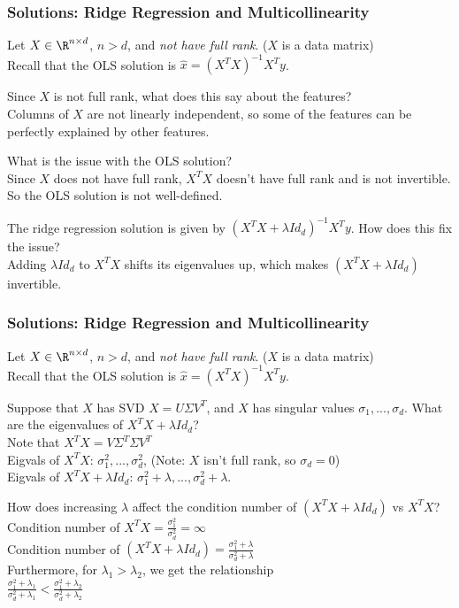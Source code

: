 \documentclass{beamer}
\renewenvironment{enumerate}%
{\begin{list}{\arabic{enumi}.}%
      {\setlength{\leftmargin}{2.5em}%
       \setlength{\itemsep}{-\parsep}%
       \setlength{\topsep}{-\parskip}%
       \usecounter{enumi}}%
 }{\end{list}}
\begin{document}
\begin{frame}
\frametitle{Solutions: Ridge Regression and Multicollinearity}
Let $X \in \R^{n\times d}$, $n>d$, and \textit{not have full rank}. ($X$ is a data matrix) \\
Recall that the OLS solution is $\hat{x} = (X^TX)^{-1}X^Ty$.
\begin{solution}
\begin{enumerate}
\item Since $X$ is not full rank, what does this say about the features?\\
Columns of $X$ are not linearly independent, so some of the features can be perfectly explained by other features.
\item What is the issue with the OLS solution? \\
Since $X$ does not have full rank, $X^TX$ doesn't have full rank and is not invertible. So the OLS solution is not well-defined.
\item The ridge regression solution is given by $(X^TX+\lambda Id_d)^{-1}X^Ty$. How does this fix the issue? \\
Adding $\lambda Id_d$ to $X^TX$ shifts its eigenvalues up, which makes $(X^TX+\lambda Id_d)$ invertible.
\end{enumerate}
\end{solution}
\end{frame}

\begin{frame}
\frametitle{Solutions: Ridge Regression and Multicollinearity}
Let $X \in \R^{n\times d}$, $n>d$, and \textit{not have full rank}. ($X$ is a data matrix) \\
Recall that the OLS solution is $\hat{x} = (X^TX)^{-1}X^Ty$.
\begin{solution}
\begin{enumerate}
\item[4.] Suppose that $X$ has SVD $X=U\Sigma V^T$, and $X$ has singular values $\sigma_1,...,\sigma_d$. What are the eigenvalues of 
$X^TX + \lambda Id_d$? \\
Note that $X^TX = V\Sigma^T \Sigma V^T$\\
Eigvals of $X^TX$: $\sigma_1^2,...,\sigma_d^2$, (Note: $X$ isn't full rank, so $\sigma_d = 0$) \\
Eigvals of $X^TX+\lambda Id_d$: $\sigma_1^2 + \lambda ,..., \sigma_d^2+\lambda$.\\
\item[5.] How does increasing $\lambda$ affect the condition number of $(X^TX + \lambda Id_d)$ vs $X^TX$?\\
Condition number of $X^TX = \frac{\sigma_1^2}{\sigma_d^2} = \infty$ \\
Condition number of $(X^TX + \lambda Id_d) = \frac{\sigma_1^2+\lambda}{\sigma_d^2+\lambda}$\\
Furthermore, for $\lambda_1 > \lambda_2$, we get the relationship \\
\quad $ \frac{\sigma_1^2+\lambda_1}{\sigma_d^2+\lambda_1} <  \frac{\sigma_1^2+\lambda_2}{\sigma_d^2+\lambda_2}$
\end{enumerate}
\end{solution}
\end{frame}
\end{document}
